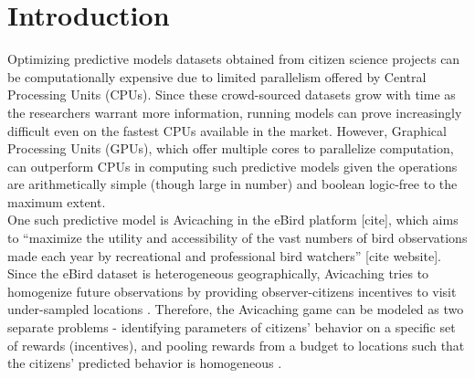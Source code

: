 \documentclass[12pt]{article}
\begin{document}
    \tableofcontents
    \listoftables
    \listoffigures
    \section{Introduction} \label{sec:introduction}
    Optimizing predictive models datasets obtained from citizen science projects can be computationally expensive due to limited parallelism offered by Central Processing Units (CPUs). Since these crowd-sourced datasets grow with time as the researchers warrant more information, running models can prove increasingly difficult even on the fastest CPUs available in the market. However, Graphical Processing Units (GPUs), which offer multiple cores to parallelize computation, can outperform CPUs in computing such predictive models given the operations are arithmetically simple (though large in number) and boolean logic-free to the maximum extent.\\
    
    One such predictive model is Avicaching \cite{Xue2016Avi1} in the eBird platform [cite], which aims to ``maximize the utility and accessibility of the vast numbers of bird observations made each year by recreational and professional bird watchers'' [cite website]. Since the eBird dataset is heterogeneous geographically, Avicaching tries to homogenize future observations by providing observer-citizens incentives to visit under-sampled locations \cite{Xue2016Avi1}. Therefore, the Avicaching game can be modeled as two separate problems - identifying parameters of citizens' behavior on a specific set of rewards (incentives), and pooling rewards from a budget to locations such that the citizens' predicted behavior is homogeneous \cite{Xue2016Avi2}.
    
\end{document}
